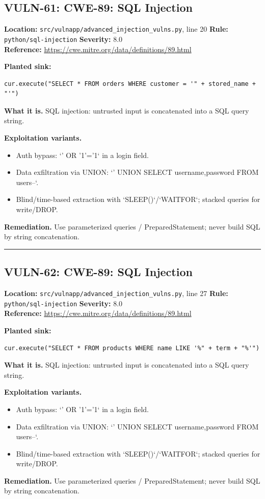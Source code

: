 \documentclass[11pt,a4paper]{article}
\begin{document}
\subsection{VULN-61: CWE-89: SQL Injection}
\noindent\textbf{Location:} \texttt{src/vulnapp/advanced\_injection\_vulns.py}, line 20 \quad \textbf{Rule:} \texttt{python/sql-injection} \quad \textbf{Severity:} 8.0
\\ \textbf{Reference:} \url{https://cwe.mitre.org/data/definitions/89.html}

\noindent\textbf{Planted sink:}
\begin{lstlisting}
cur.execute("SELECT * FROM orders WHERE customer = '" + stored_name + "'")
\end{lstlisting}
\noindent\textbf{What it is.} SQL injection: untrusted input is concatenated into a SQL query string.

\noindent\textbf{Exploitation variants.}
\begin{itemize}[leftmargin=1.4em,itemsep=1pt,topsep=2pt]
\item Auth bypass: `' OR '1'='1` in a login field.
\item Data exfiltration via UNION: `' UNION SELECT username,password FROM users--`.
\item Blind/time-based extraction with `SLEEP()`/`WAITFOR`; stacked queries for write/DROP.
\end{itemize}
\noindent\textbf{Remediation.} Use parameterized queries / PreparedStatement; never build SQL by string concatenation.

\vspace{4pt}\hrule\vspace{6pt}
\subsection{VULN-62: CWE-89: SQL Injection}
\noindent\textbf{Location:} \texttt{src/vulnapp/advanced\_injection\_vulns.py}, line 27 \quad \textbf{Rule:} \texttt{python/sql-injection} \quad \textbf{Severity:} 8.0
\\ \textbf{Reference:} \url{https://cwe.mitre.org/data/definitions/89.html}

\noindent\textbf{Planted sink:}
\begin{lstlisting}
cur.execute("SELECT * FROM products WHERE name LIKE '%" + term + "%'")
\end{lstlisting}
\noindent\textbf{What it is.} SQL injection: untrusted input is concatenated into a SQL query string.

\noindent\textbf{Exploitation variants.}
\begin{itemize}[leftmargin=1.4em,itemsep=1pt,topsep=2pt]
\item Auth bypass: `' OR '1'='1` in a login field.
\item Data exfiltration via UNION: `' UNION SELECT username,password FROM users--`.
\item Blind/time-based extraction with `SLEEP()`/`WAITFOR`; stacked queries for write/DROP.
\end{itemize}
\noindent\textbf{Remediation.} Use parameterized queries / PreparedStatement; never build SQL by string concatenation.
\end{document}
